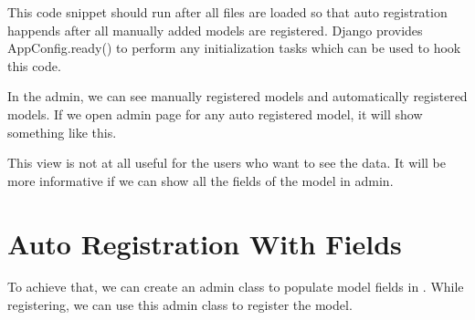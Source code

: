 \documentclass[letterpaper,12pt,english]{sphinxmanual}
\begin{document}
This code snippet should run after all  files are loaded so that auto registration happends after all manually added models are registered. Django provides AppConfig.ready() to perform any initialization tasks which can be used to hook this code.

\begin{sphinxVerbatim}[commandchars=\\\{\}]

    
   


 

     
          
           
             
\end{sphinxVerbatim}

In the admin, we can see manually registered models and automatically registered models. If we open admin page for any auto registered model, it will show something like this.


This view is not at all useful for the users who want to see the data. It will be more informative if we can show all the fields of the model in admin.


\section{Auto Registration With Fields}
\label{\detokenize{admin_auto_register_models:auto-registration-with-fields}}
To achieve that, we can create an admin class to populate model fields in . While registering, we can use this admin class to register the model.
\end{document}
